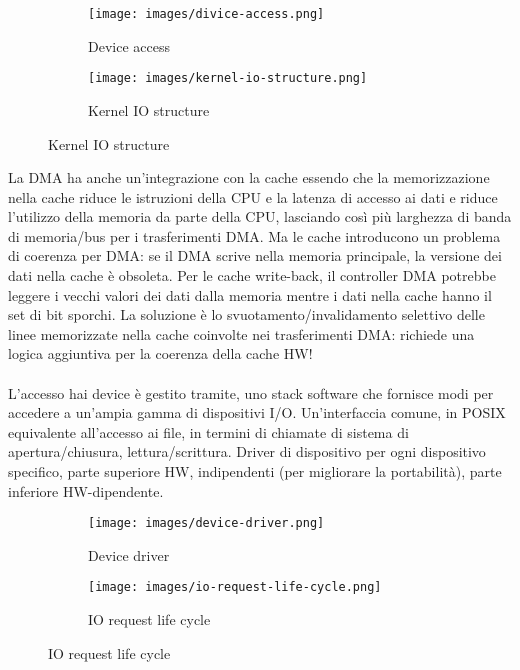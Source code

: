 \begin{figure}[h!]
    \centering
    \begin{subfigure}{.32\textwidth}
        \centering
        \texttt{[image: images/divice-access.png]}
        \caption{Device access}
    \end{subfigure}
    \begin{subfigure}{.32\textwidth}
        \centering
        \texttt{[image: images/kernel-io-structure.png]}
        \caption{Kernel IO structure}
    \end{subfigure}
\end{figure}
La DMA ha anche un'integrazione con la cache essendo che la memorizzazione nella cache riduce le istruzioni della CPU e la latenza di accesso ai dati e riduce l'utilizzo della memoria da parte della CPU, lasciando così più larghezza di banda di memoria/bus per i trasferimenti DMA. Ma le cache introducono un problema di coerenza per DMA: se il DMA scrive nella memoria principale, la versione dei dati nella cache è obsoleta. Per le cache write-back, il controller DMA potrebbe leggere i vecchi valori dei dati dalla memoria mentre i dati nella cache hanno il set di bit sporchi. La soluzione è lo svuotamento/invalidamento selettivo delle linee memorizzate nella cache 
coinvolte nei trasferimenti DMA: richiede una logica aggiuntiva per la coerenza della cache HW!\\\\
L'accesso hai device è gestito tramite, uno stack software che fornisce modi per accedere a un'ampia gamma di dispositivi I/O. 
Un'interfaccia comune, in POSIX equivalente all'accesso ai file, in termini di chiamate di sistema 
di apertura/chiusura, lettura/scrittura. Driver di dispositivo per ogni dispositivo specifico, parte superiore HW, 
indipendenti (per migliorare la portabilità), parte inferiore HW-dipendente.
\begin{figure}[h!]
    \centering
    \begin{subfigure}{.32\textwidth}
        \centering
        \texttt{[image: images/device-driver.png]}
        \caption{Device driver}
    \end{subfigure}
    \hspace{3cm}
    \begin{subfigure}{.32\textwidth}
        \centering
        \texttt{[image: images/io-request-life-cycle.png]}
        \caption{IO request life cycle}
    \end{subfigure}
\end{figure}

